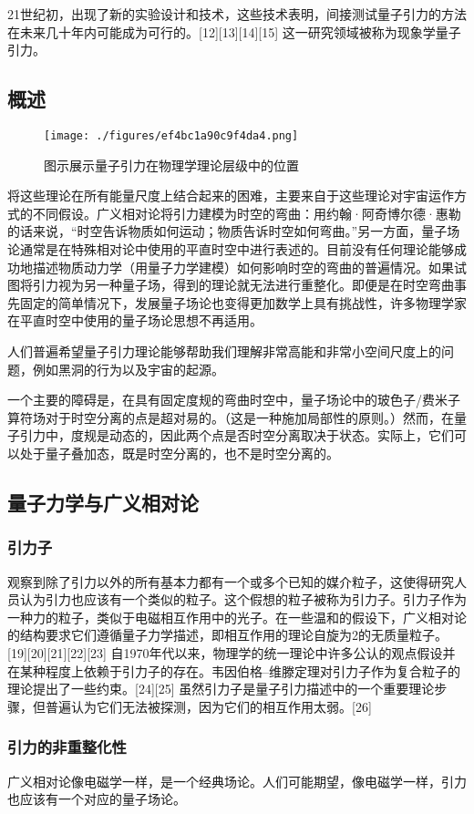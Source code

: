 21世纪初，出现了新的实验设计和技术，这些技术表明，间接测试量子引力的方法在未来几十年内可能成为可行的。[12][13][14][15] 这一研究领域被称为现象学量子引力。
\subsection{概述}
\begin{figure}[ht]
\centering
\texttt{[image: ./figures/ef4bc1a90c9f4da4.png]}
\caption{图示展示量子引力在物理学理论层级中的位置} \label{fig_LZYL_3}
\end{figure}
将这些理论在所有能量尺度上结合起来的困难，主要来自于这些理论对宇宙运作方式的不同假设。广义相对论将引力建模为时空的弯曲：用约翰·阿奇博尔德·惠勒的话来说，“时空告诉物质如何运动；物质告诉时空如何弯曲。”另一方面，量子场论通常是在特殊相对论中使用的平直时空中进行表述的。目前没有任何理论能够成功地描述物质动力学（用量子力学建模）如何影响时空的弯曲的普遍情况。如果试图将引力视为另一种量子场，得到的理论就无法进行重整化。即便是在时空弯曲事先固定的简单情况下，发展量子场论也变得更加数学上具有挑战性，许多物理学家在平直时空中使用的量子场论思想不再适用。

人们普遍希望量子引力理论能够帮助我们理解非常高能和非常小空间尺度上的问题，例如黑洞的行为以及宇宙的起源。

一个主要的障碍是，在具有固定度规的弯曲时空中，量子场论中的玻色子/费米子算符场对于时空分离的点是超对易的。（这是一种施加局部性的原则。）然而，在量子引力中，度规是动态的，因此两个点是否时空分离取决于状态。实际上，它们可以处于量子叠加态，既是时空分离的，也不是时空分离的。
\subsection{量子力学与广义相对论} 
\subsubsection{引力子}  
观察到除了引力以外的所有基本力都有一个或多个已知的媒介粒子，这使得研究人员认为引力也应该有一个类似的粒子。这个假想的粒子被称为引力子。引力子作为一种力的粒子，类似于电磁相互作用中的光子。在一些温和的假设下，广义相对论的结构要求它们遵循量子力学描述，即相互作用的理论自旋为2的无质量粒子。[19][20][21][22][23] 自1970年代以来，物理学的统一理论中许多公认的观点假设并在某种程度上依赖于引力子的存在。韦因伯格–维滕定理对引力子作为复合粒子的理论提出了一些约束。[24][25] 虽然引力子是量子引力描述中的一个重要理论步骤，但普遍认为它们无法被探测，因为它们的相互作用太弱。[26]
\subsubsection{引力的非重整化性 } 
广义相对论像电磁学一样，是一个经典场论。人们可能期望，像电磁学一样，引力也应该有一个对应的量子场论。

